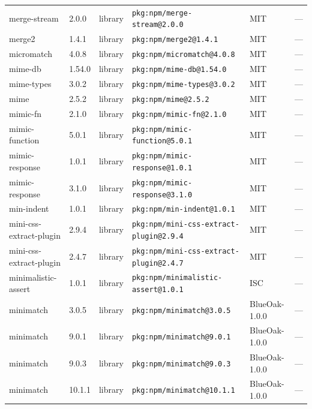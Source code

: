 \documentclass[11pt,a4paper]{article}
\begin{document}
\begin{longtable}{|p{4cm}|p{2cm}|p{1.6cm}|p{5cm}|p{1.5cm}|p{3.5cm}|}
\raggedright merge-stream & 2.0.0 & library & \small\texttt{pkg:npm/merge-stream@2.0.0} & MIT & \small — \\
\raggedright merge2 & 1.4.1 & library & \small\texttt{pkg:npm/merge2@1.4.1} & MIT & \small — \\
\raggedright micromatch & 4.0.8 & library & \small\texttt{pkg:npm/micromatch@4.0.8} & MIT & \small — \\
\raggedright mime-db & 1.54.0 & library & \small\texttt{pkg:npm/mime-db@1.54.0} & MIT & \small — \\
\raggedright mime-types & 3.0.2 & library & \small\texttt{pkg:npm/mime-types@3.0.2} & MIT & \small — \\
\raggedright mime & 2.5.2 & library & \small\texttt{pkg:npm/mime@2.5.2} & MIT & \small — \\
\raggedright mimic-fn & 2.1.0 & library & \small\texttt{pkg:npm/mimic-fn@2.1.0} & MIT & \small — \\
\raggedright mimic-function & 5.0.1 & library & \small\texttt{pkg:npm/mimic-function@5.0.1} & MIT & \small — \\
\raggedright mimic-response & 1.0.1 & library & \small\texttt{pkg:npm/mimic-response@1.0.1} & MIT & \small — \\
\raggedright mimic-response & 3.1.0 & library & \small\texttt{pkg:npm/mimic-response@3.1.0} & MIT & \small — \\
\raggedright min-indent & 1.0.1 & library & \small\texttt{pkg:npm/min-indent@1.0.1} & MIT & \small — \\
\raggedright mini-css-extract-plugin & 2.9.4 & library & \small\texttt{pkg:npm/mini-css-extract-plugin@2.9.4} & MIT & \small — \\
\raggedright mini-css-extract-plugin & 2.4.7 & library & \small\texttt{pkg:npm/mini-css-extract-plugin@2.4.7} & MIT & \small — \\
\raggedright minimalistic-assert & 1.0.1 & library & \small\texttt{pkg:npm/minimalistic-assert@1.0.1} & ISC & \small — \\
\raggedright minimatch & 3.0.5 & library & \small\texttt{pkg:npm/minimatch@3.0.5} & BlueOak-1.0.0 & \small — \\
\raggedright minimatch & 9.0.1 & library & \small\texttt{pkg:npm/minimatch@9.0.1} & BlueOak-1.0.0 & \small — \\
\raggedright minimatch & 9.0.3 & library & \small\texttt{pkg:npm/minimatch@9.0.3} & BlueOak-1.0.0 & \small — \\
\raggedright minimatch & 10.1.1 & library & \small\texttt{pkg:npm/minimatch@10.1.1} & BlueOak-1.0.0 & \small — \\

\end{longtable}
\end{document}
